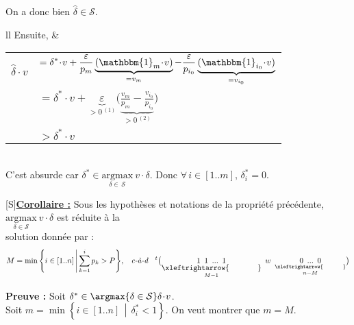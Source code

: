 \documentclass{scrartcl}
\renewcommand{\cal}[1]{\mathcal{#1}}
\newcommand{\rm}[1]{\mathrm{#1}}
\newcommand{\elt}[1]{\textbf{#1}}
\newcommand{\dotp}{\! \cdot \!}
\newcommand{\1}{\mathbbm{1}}
\begin{document}
			On a donc bien $\widehat{\delta} \in \cal{S}$.
				\\[3.5mm]
			\hspace*{-3.5mm}
				\begin{tabular}[t]{ll}
					Ensuite, \hspace{-4mm} &
					\begin{tabular}[t]{ll}
						\( \widehat{\delta} \dotp v \) \hspace{-4mm}
						& \( = \displaystyle \delta^* \dotp v + \frac{\varepsilon}{p_m} \underbrace{(\1_m \dotp v)}_{=v_m} - \frac{\varepsilon}{p_{i_0}} \underbrace{(\1_{i_0} \dotp v)}_{=v_{i_0}} \) \\
						& \( = \displaystyle \delta^* \dotp v + \underbrace{\varepsilon}_{> 0 \, ^{(1)}} \Big( \! \underbrace{\frac{v_m}{p_m} - \frac{v_{i_0}}{p_{i_0}}}_{> 0 \, ^{(2)}} \! \Big) \) \\[-4mm]
						& \( > \delta^* \dotp v \)
					\end{tabular}
				\end{tabular} \\
			C'est absurde car \( \delta^* \in \underset{\delta \in \, \cal{S}}{\rm{argmax}} \: v \dotp \delta \).
			Donc \( \forall \, i \in [1..m], \, \delta^*_i = 0 \).
		\pagebreak
		\begin{center}[S]{\elt{\underline{Corollaire :}}}
			Sous les hypothèses et notations de la propriété précédente, \( \underset{\delta \in \cal{S}}{\rm{argmax}} \: v \dotp \delta \) est réduite à la \\[-2.5mm] solution donnée par :
				\vspace{-5mm}
				\[
					M = \min \left\{ i \in [1..n] \, \middle| \, \sum_{k=1}^{i} p_k > P \right\} \!, \hspace{3mm} \text{\emph{c-à-d}} \hspace{3mm} ^t \big(\underset{\underset{\scriptstyle{M-1}}{\textstyle \xleftrightarrow{\hspace*{13mm}}}}{1 \ \, 1 \ \, ... \ \, 1} \ \, w \ \, \underset{\underset{\scriptstyle n-M}{\xleftrightarrow{\hspace*{9mm}}}}{0 \ \, ... \ \, 0} \big)
				\]
				\vspace{-4mm}
		\end{center}
		\elt{Preuve :} Soit \( \delta^* \in \argmax{\delta \in \cal{S}} \delta \dotp v \). \\
		Soit \( m = \min \left\{ i \in [1..n] \, \middle| \, \delta^*_i < 1 \right\}\). On veut montrer que \( m = M \). \\
		\hspace*{-3.6mm}
\end{document}
